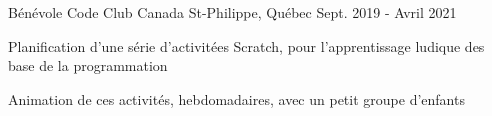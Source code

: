 

\begin{cventries}

  \cventry
    {Bénévole} %
    {Code Club Canada} %
    {St-Philippe, Québec} %
    {Sept. 2019 - Avril 2021} %
    {
      \begin{cvitems} %
        \item {Planification d'une série d'activitées Scratch, pour l'apprentissage ludique des base de la programmation}
        \item {Animation de ces activités, hebdomadaires, avec un petit groupe d'enfants}
      \end{cvitems}
    }

\end{cventries}
